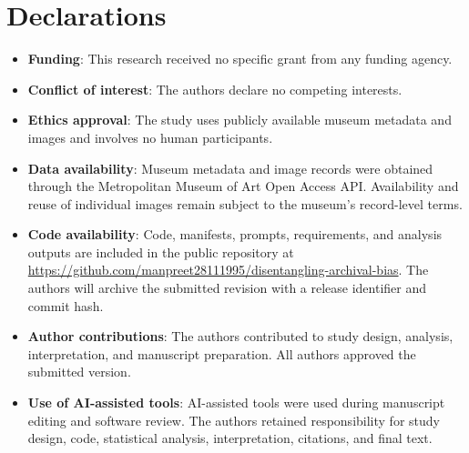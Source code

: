 \documentclass[pdflatex,sn-basic,Numbered]{sn-jnl}
\begin{document}
\section*{Declarations}
\begin{itemize}
\item \textbf{Funding}: This research received no specific grant from any funding agency.
\item \textbf{Conflict of interest}: The authors declare no competing interests.
\item \textbf{Ethics approval}: The study uses publicly available museum metadata and images and involves no human participants.
\item \textbf{Data availability}: Museum metadata and image records were obtained through the Metropolitan Museum of Art Open Access API. Availability and reuse of individual images remain subject to the museum's record-level terms.
\item \textbf{Code availability}: Code, manifests, prompts, requirements, and analysis outputs are included in the public repository at \url{https://github.com/manpreet28111995/disentangling-archival-bias}. The authors will archive the submitted revision with a release identifier and commit hash.
\item \textbf{Author contributions}: The authors contributed to study design, analysis, interpretation, and manuscript preparation. All authors approved the submitted version.
\item \textbf{Use of AI-assisted tools}: AI-assisted tools were used during manuscript editing and software review. The authors retained responsibility for study design, code, statistical analysis, interpretation, citations, and final text.
\end{itemize}


\end{document}

